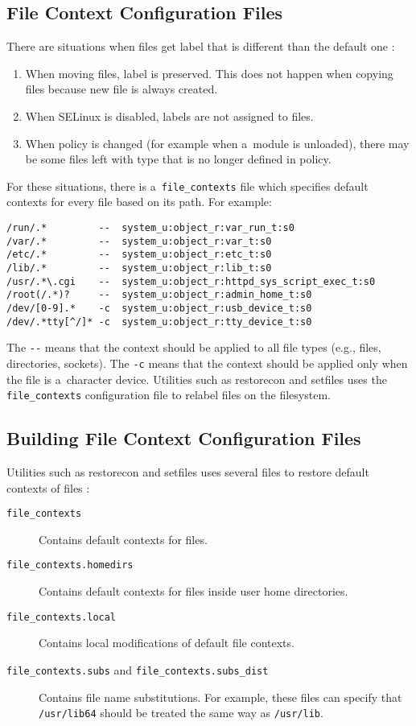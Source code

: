 \subsection{File Context Configuration Files}
There are situations when files get label that is different than the default
one \cite{selinuxguide}:
\begin{enumerate}
    \item When moving files, label is preserved. This does not happen when
        copying files because new file is always created.
    \item When SELinux is disabled, labels are not assigned to files.
    \item When policy is changed (for example when a~module is unloaded), there
        may be some files left with type that is no longer defined in policy.
\end{enumerate}
For these situations, there is a~\texttt{file\_contexts} file which specifies
default contexts for every file based on its path. For example:
\begin{lstlisting}
/run/.*         --  system_u:object_r:var_run_t:s0
/var/.*	        --  system_u:object_r:var_t:s0
/etc/.*	        --  system_u:object_r:etc_t:s0
/lib/.*	        --  system_u:object_r:lib_t:s0
/usr/.*\.cgi    --  system_u:object_r:httpd_sys_script_exec_t:s0
/root(/.*)?     --  system_u:object_r:admin_home_t:s0
/dev/[0-9].*    -c  system_u:object_r:usb_device_t:s0
/dev/.*tty[^/]* -c  system_u:object_r:tty_device_t:s0
\end{lstlisting}
The \texttt{-{}-} means that the context should be applied to all file types
(e.g., files, directories, sockets). The \texttt{-c} means that the context
should be applied only when the file is a~character device. Utilities such as
restorecon and setfiles uses the \texttt{file\_contexts} configuration file to
relabel files on the filesystem.

\subsection{Building File Context Configuration Files}
Utilities such as restorecon and setfiles uses several files to
restore default contexts of files \cite[pp.~165--167]{tsn}:
\begin{description}
    \item [\texttt{file\_contexts}] Contains default contexts for files.
    \item [\texttt{file\_contexts.homedirs}] Contains default contexts for files
        inside user home directories.
    \item [\texttt{file\_contexts.local}] Contains local modifications of
        default file contexts.
    \item [\texttt{file\_contexts.subs} and \texttt{file\_contexts.subs\_dist}]
        Contains file name substitutions. For example, these files can specify
        that \texttt{/usr/lib64} should be treated the same way as
        \texttt{/usr/lib}.
\end{description}

